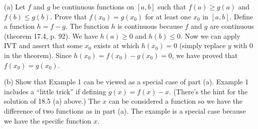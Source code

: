 
(a) Let $f$ and $g$ be continuous functions on $[a,b]$ such that
$f(a)\ge g(a)$ and $f(b)\le g(b)$. Prove that $f(x_0)=g(x_0)$ for at least
one $x_0$ in $[a,b]$.
\medskip
Define a function $h=f-g.$
The function $h$ is continuous because $f$ and $g$ are continuous
(theorem 17.4, p. 92).
We have $h(a)\ge0$ and $h(b)\le0$.
Now we can apply IVT and assert that some $x_0$ exists at which $h(x_0)=0$
(simply replace $y$ with 0 in the theorem).
Since $h(x_0)=f(x_0)-g(x_0)=0$, we have proved that $f(x_0)=g(x_0)$.

\medskip
(b) Show that Example 1 can be viewed as a special case of part (a).
\medskip
Example 1 includes a ``little trick'' if defining $g(x)=f(x)-x$.
(There's the hint for the solution of 18.5 (a) above.)
The $x$ can be considered a function so we have the difference of two
functions as in part (a). The example is a special case because we have the
specific function $x$.

